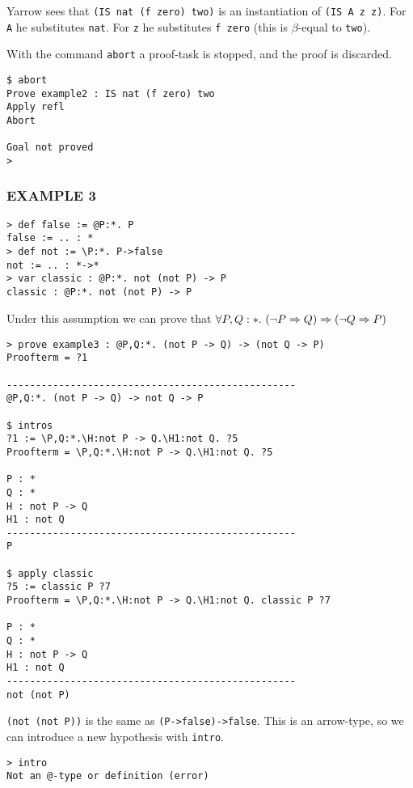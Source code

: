 Yarrow sees that {\tt (IS nat (f zero) two)}
is an instantiation of {\tt (IS A z z)}.
For {\tt A} he substitutes {\tt nat}.
For {\tt z} he substitutes {\tt f zero} 
(this is $\beta$-equal to {\tt two}).

With the command {\tt abort} 
a proof-task is stopped, and the proof is discarded.

\begin{verbatim}
$ abort
Prove example2 : IS nat (f zero) two
Apply refl
Abort

Goal not proved
>
\end{verbatim}


\subsubsection*{EXAMPLE 3}

\begin{verbatim}
> def false := @P:*. P
false := .. : *
> def not := \P:*. P->false
not := .. : *->*
> var classic : @P:*. not (not P) -> P
classic : @P:*. not (not P) -> P
\end{verbatim}
Under this assumption we can prove that
$
\forall P,Q:\st.\   
(\neg P \Rightarrow Q) \Rightarrow  (\neg Q \Rightarrow P )
$
\begin{verbatim}
> prove example3 : @P,Q:*. (not P -> Q) -> (not Q -> P)
Proofterm = ?1

--------------------------------------------------
@P,Q:*. (not P -> Q) -> not Q -> P

$ intros
?1 := \P,Q:*.\H:not P -> Q.\H1:not Q. ?5
Proofterm = \P,Q:*.\H:not P -> Q.\H1:not Q. ?5

P : *
Q : *
H : not P -> Q
H1 : not Q
--------------------------------------------------
P

$ apply classic
?5 := classic P ?7
Proofterm = \P,Q:*.\H:not P -> Q.\H1:not Q. classic P ?7

P : *
Q : *
H : not P -> Q
H1 : not Q
--------------------------------------------------
not (not P)
\end{verbatim}

{\tt (not (not P))} is the same as {\tt (P->false)->false}.
This is an arrow-type, so we can introduce a new hypothesis with {\tt intro}.

\begin{verbatim}
> intro
Not an @-type or definition (error)
\end{verbatim}

